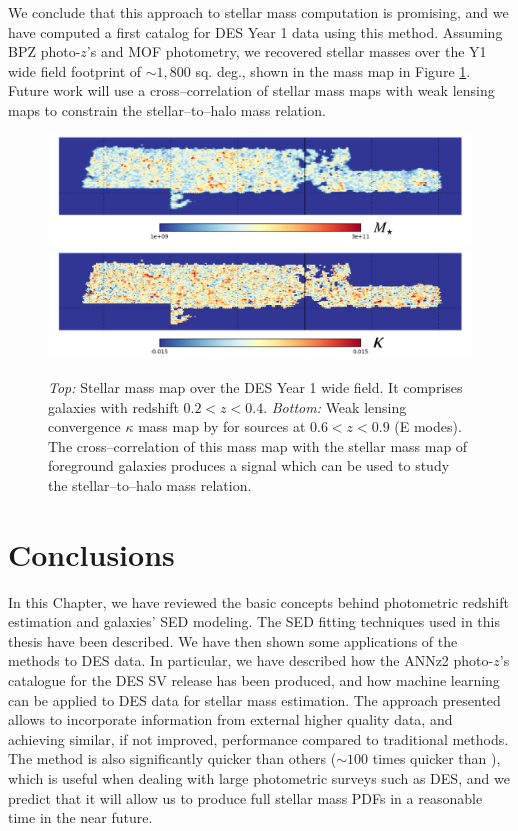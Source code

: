 We conclude that this approach to stellar mass computation is promising, and we have computed a first catalog for DES Year 1 data using this method. Assuming BPZ photo-$z$'s and MOF photometry, we recovered stellar masses over the Y1 wide field footprint of $\sim 1,800$ sq. deg., shown in the mass map in Figure \ref{fig:massmap}. Future work will use a cross--correlation of stellar mass maps with weak lensing maps to constrain the stellar--to--halo mass relation.

\begin{figure}\centering \includegraphics[width=1\textwidth]{./chapters/chapter2/figs/smass_map.png}
 \includegraphics[width=1\textwidth]{./chapters/chapter2/figs/wl_mass_map.png}
\caption{\emph{Top:} Stellar mass map over the DES Year 1 wide field. It comprises galaxies with redshift $0.2<z<0.4$. \emph{Bottom:} Weak lensing convergence $\kappa$ mass map by \citet{2018MNRAS.475.3165C} for sources at $0.6<z<0.9$ (E modes). The cross--correlation of this mass map with the stellar mass map of foreground galaxies produces a signal which can be used to study the stellar--to--halo mass relation.}\label{fig:massmap}\end{figure}


\section{Conclusions}

In this Chapter, we have reviewed the basic concepts behind photometric redshift estimation and galaxies' SED modeling. The SED fitting techniques used in this thesis have been described. We have then shown some applications of the methods to DES data. In particular, we have described how the ANNz2 photo-$z$'s catalogue for the DES SV release has been produced, and how machine learning can be applied to DES data for stellar mass estimation. The approach presented allows to incorporate information from external higher quality data, and achieving similar, if not improved, performance compared to traditional methods. The method is also significantly quicker than others ($\sim 100$ times quicker than ), which is useful when dealing with large photometric surveys such as DES, and we predict that it will allow us to produce full stellar mass PDFs in a reasonable time in the near future.











